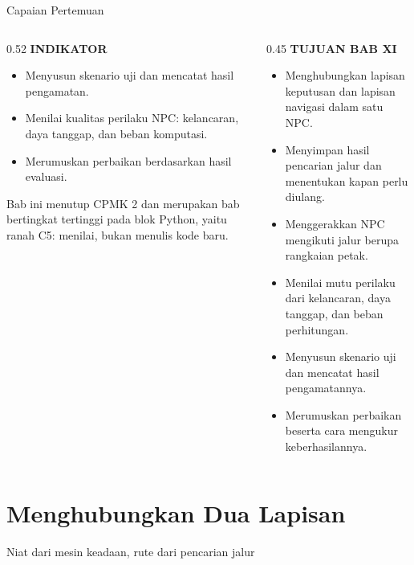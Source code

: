 \documentclass[aspectratio=169,10pt]{beamer}
\begin{document}
\begin{frame}{Capaian Pertemuan}
\begin{columns}[T,onlytextwidth]
\begin{column}{0.52\textwidth}
    {\fontsize{7}{8.5}\selectfont\bfseries\color{ubAccent}INDIKATOR}\par
    \vspace{0.06cm}
    \begin{itemize}
      \item Menyusun skenario uji dan mencatat hasil pengamatan.
      \item Menilai kualitas perilaku NPC: kelancaran, daya tanggap, dan beban
            komputasi.
      \item Merumuskan perbaikan berdasarkan hasil evaluasi.
    \end{itemize}
    \vspace{0.10cm}
    \begin{kotak}
      Bab ini menutup CPMK 2 dan merupakan bab bertingkat tertinggi pada blok
      Python, yaitu ranah C5: menilai, bukan menulis kode baru.
    \end{kotak}
  \end{column}
  \begin{column}{0.45\textwidth}
    {\fontsize{7}{8.5}\selectfont\bfseries\color{ubAccent}TUJUAN BAB XI}\par
    \vspace{0.08cm}
    \begin{itemize}
      \item Menghubungkan lapisan keputusan dan lapisan navigasi dalam satu NPC.
      \item Menyimpan hasil pencarian jalur dan menentukan kapan perlu diulang.
      \item Menggerakkan NPC mengikuti jalur berupa rangkaian petak.
      \item Menilai mutu perilaku dari kelancaran, daya tanggap, dan beban
            perhitungan.
      \item Menyusun skenario uji dan mencatat hasil pengamatannya.
      \item Merumuskan perbaikan beserta cara mengukur keberhasilannya.
    \end{itemize}
  \end{column}
\end{columns}
\end{frame}

\section{Menghubungkan Dua Lapisan}
  {Niat dari mesin keadaan, rute dari pencarian jalur}
\end{document}
